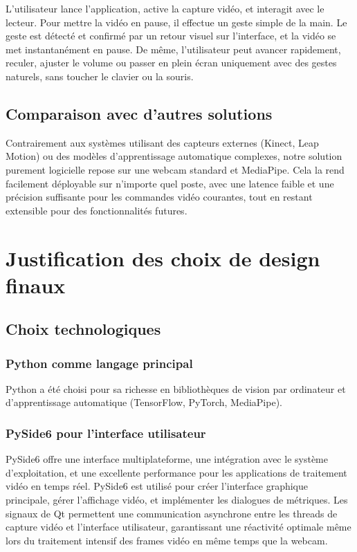 \documentclass[12pt,a4paper]{article}
\begin{document}
L'utilisateur lance l'application, active la capture vidéo, et interagit avec le lecteur. Pour mettre la vidéo en pause, il effectue un geste simple de la main. Le geste est détecté et confirmé par un retour visuel sur l'interface, et la vidéo se met instantanément en pause. De même, l'utilisateur peut avancer rapidement, reculer, ajuster le volume ou passer en plein écran uniquement avec des gestes naturels, sans toucher le clavier ou la souris.

\subsection{Comparaison avec d'autres solutions}

Contrairement aux systèmes utilisant des capteurs externes (Kinect, Leap Motion) ou des modèles d'apprentissage automatique complexes, notre solution purement logicielle repose sur une webcam standard et MediaPipe. Cela la rend facilement déployable sur n'importe quel poste, avec une latence faible et une précision suffisante pour les commandes vidéo courantes, tout en restant extensible pour des fonctionnalités futures.

\section{Justification des choix de design finaux}

\subsection{Choix technologiques}

\subsubsection{Python comme langage principal}

Python a été choisi pour sa richesse en bibliothèques de vision par ordinateur et d'apprentissage automatique (TensorFlow, PyTorch, MediaPipe).

\subsubsection{PySide6 pour l'interface utilisateur}

PySide6 offre une interface multiplateforme, une intégration avec le système d'exploitation, et une excellente performance pour les applications de traitement vidéo en temps réel. PySide6 est utilisé pour créer l'interface graphique principale, gérer l'affichage vidéo, et implémenter les dialogues de métriques. Les signaux de Qt permettent une communication asynchrone entre les threads de capture vidéo et l'interface utilisateur, garantissant une réactivité optimale même lors du traitement intensif des frames vidéo en même temps que la webcam.
\end{document}
